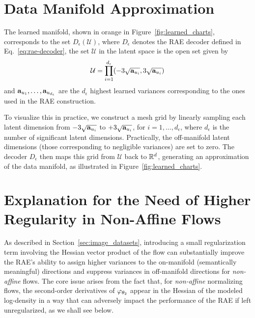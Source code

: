 \section{Data Manifold Approximation}
\label{app:data_manifold_approximation}

The learned manifold, shown in orange in Figure~\ref{fig:learned_charts}, corresponds to the set $D_{\epsilon}(\mathcal{U})$, where $D_{\epsilon}$ denotes the RAE decoder defined in Eq.~\ref{eq:rae-decoder}, the set \( \mathcal{U} \) in the latent space is the open set given by
\[
    \mathcal{U} = \prod_{i=1}^{d_{\epsilon}} (-3\sqrt{\mathbf{a}_{u_i}}, 3\sqrt{\mathbf{a}_{u_i}})
\]
and \( \mathbf{a}_{u_1}, \dots, \mathbf{a}_{u_{d_{\epsilon}}} \) are the \( d_{\epsilon} \) highest learned variances corresponding to the ones used in the RAE construction. 

To visualize this in practice, we construct a mesh grid by linearly sampling each latent dimension from \( -3\sqrt{\mathbf{a}_{u_i}} \) to \( +3\sqrt{\mathbf{a}_{u_i}} \), for \( i = 1, \dots, d_{\epsilon} \), where \( d_{\epsilon} \) is the number of significant latent dimensions. Practically, the off-manifold latent dimensions (those corresponding to negligible variances) are set to zero. The decoder \( D_{\epsilon} \) then maps this grid from \( \mathcal{U} \) back to \( \mathbb{R}^d \), generating an approximation of the data manifold, as illustrated in Figure~\ref{fig:learned_charts}.

\section{Explanation for the Need of Higher Regularity in Non-Affine Flows}
\label{app:expanded_loss_function}

As described in Section~\ref{sec:image_datasets}, introducing a small regularization term involving the Hessian vector product of the flow can substantially improve the RAE’s ability to assign higher variances to the on-manifold (semantically meaningful) directions and suppress variances in off-manifold directions for \textit{non-affine} flows. The core issue arises from the fact that, for \emph{non-affine} normalizing flows, the second-order derivatives of \(\varphi_{\theta_2}\) appear in the Hessian of the modeled log-density in a way that can adversely impact the performance of the RAE if left unregularized, as we shall see below.

